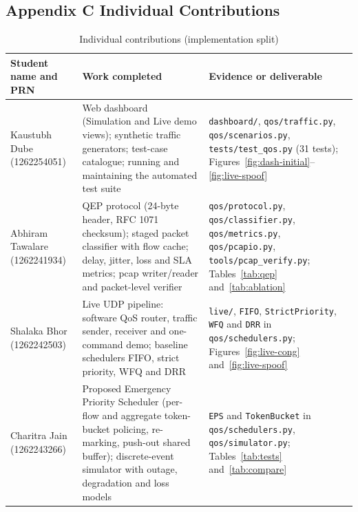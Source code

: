 \documentclass[12pt,a4paper]{article}
\newcommand{\code}[1]{\texttt{#1}}
\begin{document}
\subsection*{Appendix C \quad Individual Contributions}
\begin{table}[H]\centering\small
\caption{Individual contributions (implementation split)}\label{tab:contrib}
\begin{tabularx}{\textwidth}{|l|X|X|}\hline
\textbf{Student name and PRN} & \textbf{Work completed} & \textbf{Evidence or deliverable}\\\hline
Kaustubh Dube (1262254051) & Web dashboard (Simulation and Live demo views); synthetic traffic generators; test-case catalogue; running and maintaining the automated test suite & \code{dashboard/}, \code{qos/traffic.py}, \code{qos/scenarios.py}, \code{tests/test\_qos.py} (31 tests); Figures~\ref{fig:dash-initial}--\ref{fig:live-spoof}\\\hline
Abhiram Tawalare (1262241934) & QEP protocol (24-byte header, RFC 1071 checksum); staged packet classifier with flow cache; delay, jitter, loss and SLA metrics; pcap writer/reader and packet-level verifier & \code{qos/protocol.py}, \code{qos/classifier.py}, \code{qos/metrics.py}, \code{qos/pcapio.py}, \code{tools/pcap\_verify.py}; Tables~\ref{tab:qep} and~\ref{tab:ablation}\\\hline
Shalaka Bhor (1262242503) & Live UDP pipeline: software QoS router, traffic sender, receiver and one-command demo; baseline schedulers FIFO, strict priority, WFQ and DRR & \code{live/}, \code{FIFO}, \code{StrictPriority}, \code{WFQ} and \code{DRR} in \code{qos/schedulers.py}; Figures~\ref{fig:live-cong} and~\ref{fig:live-spoof}\\\hline
Charitra Jain (1262243266) & Proposed Emergency Priority Scheduler (per-flow and aggregate token-bucket policing, re-marking, push-out shared buffer); discrete-event simulator with outage, degradation and loss models & \code{EPS} and \code{TokenBucket} in \code{qos/schedulers.py}, \code{qos/simulator.py}; Tables~\ref{tab:tests} and~\ref{tab:compare}\\\hline
\end{tabularx}
\end{table}
\end{document}

